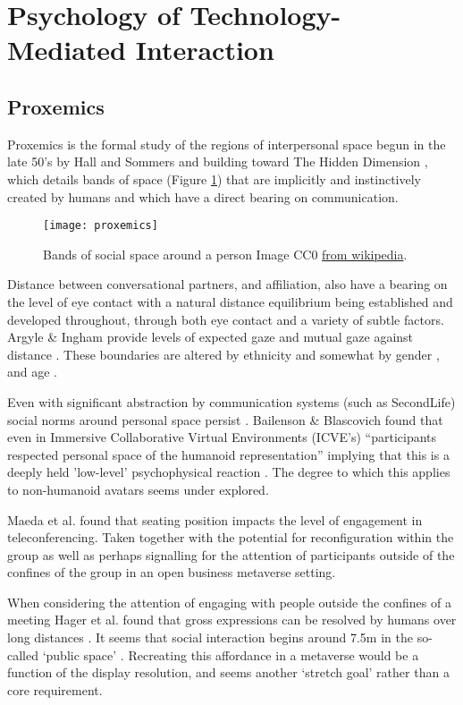 \section{Psychology of Technology-Mediated Interaction}       
\subsection{Proxemics}
Proxemics is the formal study of the regions of interpersonal space begun in the late 50's by Hall and Sommers and building toward The Hidden Dimension \cite{Hall1969}, which details bands of space (Figure \ref{fig:proxemics}) that are implicitly and instinctively created by humans and which have a direct bearing on communication.
\begin{figure}[!h]
\texttt{[image: proxemics]}
\caption{Bands of social space around a person Image CC0 \href{https://en.wikipedia.org/wiki/Proxemics}{from wikipedia}.}
\label{fig:proxemics}
\end{figure}                                       
Distance between conversational partners, and affiliation, also have a bearing on the level of eye contact \cite{Argyle1965} with a natural distance equilibrium being established and developed throughout, through both eye contact and a variety of subtle factors. Argyle \& Ingham provide levels of expected gaze and mutual gaze against distance \cite{Argyle1969}. These boundaries are altered by ethnicity \cite{Watson1966, Argyle1988} and somewhat by gender \cite{Bruno2013}, and age \cite{Slessor2008, Hofmann2006}.\par
Even with significant abstraction by communication systems (such as SecondLife) social norms around personal space persist \cite{Yee2007, Bailenson2001, Bailenson2003}. Bailenson \& Blascovich found that even in Immersive Collaborative Virtual Environments (ICVE's) ``participants respected personal space of the humanoid representation''\cite{Bailenson2001} implying that this is a deeply held 'low-level' psychophysical reaction \cite{Blascovich2002}. The degree to which this applies to non-humanoid avatars seems under explored.\par
Maeda et al. \cite{Maeda2004} found that seating position impacts the level of engagement in teleconferencing. Taken together with the potential for reconfiguration within the group as well as perhaps signalling for the attention of participants outside of the confines of the group in an open business metaverse setting.\par
When considering the attention of engaging with people outside the confines of a meeting Hager et al. found that gross expressions can be resolved by humans over long distances \cite{Hager1979, Argyle1988}. It seems that social interaction begins around 7.5m in the so-called `public space' \cite{Hall1969}. Recreating this affordance in a metaverse would be a function of the display resolution, and seems another `stretch goal' rather than a core requirement.\par                
